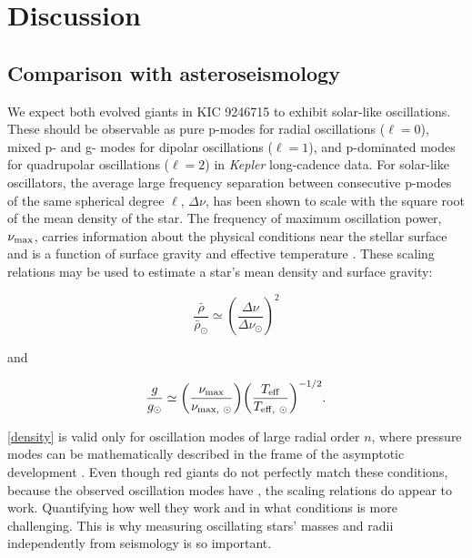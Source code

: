 \section{Discussion}\label{discuss}

\subsection{Comparison with asteroseismology}\label{seismo}
We expect both evolved giants in KIC 9246715 to exhibit solar-like oscillations. These should be observable as pure p-modes for radial oscillations ($\ell = 0$), mixed p- and g- modes for dipolar oscillations ($\ell = 1$), and p-dominated modes for quadrupolar oscillations ($\ell = 2$) in \emph{Kepler} long-cadence data. For solar-like oscillators, the average large frequency separation between consecutive p-modes of the same spherical degree $\ell$, $\Delta \nu$, has been shown to scale with the square root of the mean density of the star. The frequency of maximum oscillation power, $\nu_{\rm{max}}$, carries information about the physical conditions near the stellar surface and is a function of surface gravity and effective temperature \citep{kje95}. These scaling relations may be used to estimate a star's mean density and surface gravity:

\begin{equation} \label{density}
{\frac{\bar{\rho}}{\bar{\rho}_{\odot}}} \simeq {\left( \frac{\Delta \nu}{\Delta \nu_{\odot}} \right)}^{2}
\end{equation}

\noindent and

\begin{equation} \label{gravity}
{\frac{g}{g_{\odot}}} \simeq {\left( \frac{\nu_{\rm{max}}}{\nu_{\rm{max}, \ \odot}} \right)} {\left( \frac{T_{\rm{eff}}}{T_{\rm{eff}, \ \odot}} \right)}^{-1/2}.
\end{equation}

 \ref{density} is valid only for oscillation modes of large radial order $n$, where pressure modes can be mathematically described in the frame of the asymptotic development \citep{tas80}. Even though red giants do not perfectly match these conditions, because the observed oscillation modes have , the scaling relations do appear to work. Quantifying how well they work and in what conditions is more challenging. This is why measuring oscillating stars' masses and radii independently from seismology is so important.

